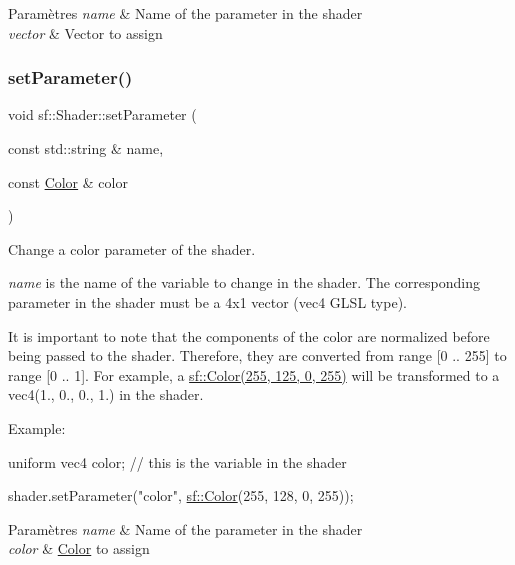 \begin{DoxyParams}{Paramètres}
{\em name} & Name of the parameter in the shader \\
\hline
{\em vector} & Vector to assign \\
\hline
\end{DoxyParams}
\mbox{\label{classsf_1_1Shader_aa8618119ed4399df3fd33e78ee96b4fc}} 
\subsubsection{\texorpdfstring{set\+Parameter()}{setParameter()}\hspace{0.1cm}{\footnotesize\ttfamily [7/10]}}
{\footnotesize\ttfamily void sf\+::\+Shader\+::set\+Parameter (\begin{DoxyParamCaption}\item[{const std\+::string \&}]{name,  }\item[{const \hyperlink{classsf_1_1Color}{Color} \&}]{color }\end{DoxyParamCaption})}



Change a color parameter of the shader. 

{\itshape name} is the name of the variable to change in the shader. The corresponding parameter in the shader must be a 4x1 vector (vec4 G\+L\+SL type).

It is important to note that the components of the color are normalized before being passed to the shader. Therefore, they are converted from range \mbox{[}0 .. 255\mbox{]} to range \mbox{[}0 .. 1\mbox{]}. For example, a \hyperlink{classsf_1_1Color}{sf\+::\+Color(255, 125, 0, 255)} will be transformed to a vec4(1., 0., 0., 1.) in the shader.

Example\+: 
\begin{DoxyCode}
uniform vec4 color; \textcolor{comment}{// this is the variable in the shader}
\end{DoxyCode}
 
\begin{DoxyCode}
shader.setParameter(\textcolor{stringliteral}{"color"}, \hyperlink{classsf_1_1Color}{sf::Color}(255, 128, 0, 255));
\end{DoxyCode}



\begin{DoxyParams}{Paramètres}
{\em name} & Name of the parameter in the shader \\
\hline
{\em color} & \hyperlink{classsf_1_1Color}{Color} to assign \\
\hline
\end{DoxyParams}
\mbox{\label{classsf_1_1Shader_a8599ee1348407025039b89ddf3f7cb62}} 
